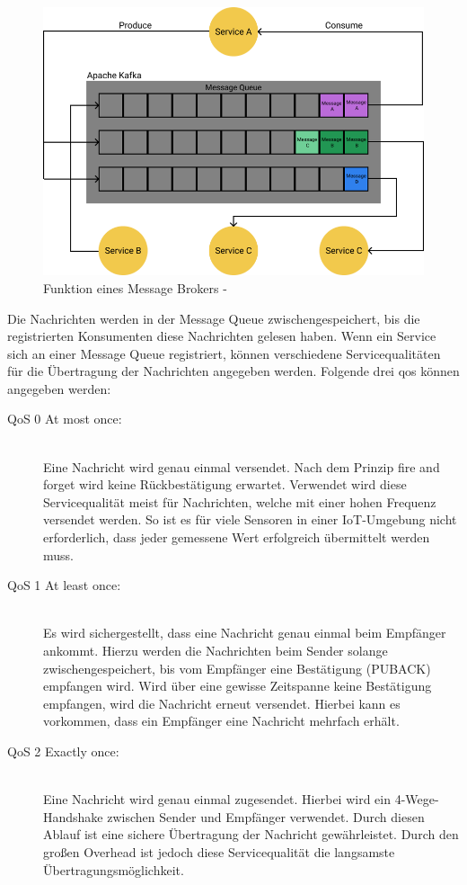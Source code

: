 \begin{figure}[H]
    \centering
    \includegraphics[width=0.65\linewidth]{images/apache-kafka.png}
    \caption{Funktion eines Message Brokers - \cite{MichaelSchwab.2019}}
    \label{fig:Message_Broker_Queue}
\end{figure}

Die Nachrichten werden in der Message Queue zwischengespeichert, bis die registrierten Konsumenten diese Nachrichten gelesen haben. Wenn ein Service sich an einer Message Queue registriert, können verschiedene Servicequalitäten für die Übertragung der Nachrichten angegeben werden. Folgende drei \glqq \gls{qos}\grqq{} können angegeben werden: \cite{ApacheSoftwareFoundation.2021}

\begin{description}
    \item[QoS 0 \glqq At most once\grqq{}:]\hfill \\
    Eine Nachricht wird genau einmal versendet. Nach dem Prinzip \glqq fire and forget\grqq{} wird keine Rückbestätigung erwartet. Verwendet wird diese Servicequalität meist für Nachrichten, welche mit einer hohen Frequenz versendet werden. So ist es für viele Sensoren in einer IoT-Umgebung nicht erforderlich, dass jeder gemessene Wert erfolgreich übermittelt werden muss.
    
    \item[QoS 1 \glqq At least once\grqq{}:]\hfill \\
    Es wird sichergestellt, dass eine Nachricht genau einmal beim Empfänger ankommt. Hierzu werden die Nachrichten beim Sender solange zwischengespeichert, bis vom Empfänger eine Bestätigung (PUBACK) empfangen wird. Wird über eine gewisse Zeitspanne keine Bestätigung empfangen, wird die Nachricht erneut versendet. Hierbei kann es vorkommen, dass ein Empfänger eine Nachricht mehrfach erhält. \cite{FlorianRaschbichler.2017}
    
    \item[QoS 2 \glqq Exactly once\grqq{}:]\hfill \\
    Eine Nachricht wird genau einmal zugesendet. Hierbei wird ein 4-Wege-Handshake zwischen Sender und Empfänger verwendet. Durch diesen Ablauf ist eine sichere Übertragung der Nachricht gewährleistet. Durch den großen Overhead ist jedoch diese Servicequalität die langsamste Übertragungsmöglichkeit.

\end{description}

